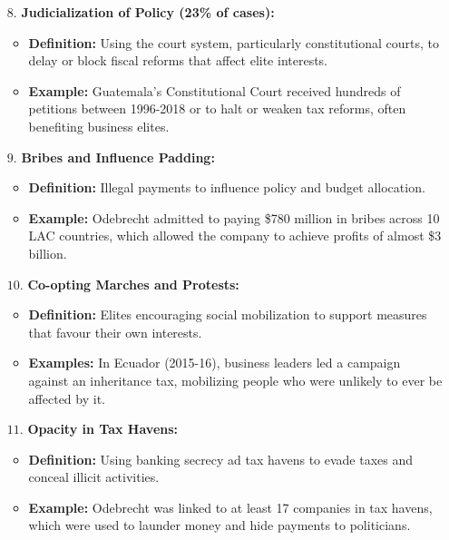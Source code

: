 \documentclass{article}
\begin{document}
\begin{itemize}
\begin{itemize}
        \end{itemize}
        \item[$8$.] \textbf{Judicialization of Policy (23\% of cases):}
        \begin{itemize}
            \item \textbf{Definition:} Using the court system, particularly
            constitutional courts, to delay or block fiscal reforms that
            affect elite interests.
            \item \textbf{Example:} Guatemala's Constitutional Court
            received hundreds of petitions between 1996-2018 or to halt or
            weaken tax reforms, often benefiting business elites.
        \end{itemize}
        \item[$9$.] \textbf{Bribes and Influence Padding:}
        \begin{itemize}
            \item \textbf{Definition:} Illegal payments to influence policy
            and budget allocation.
            \item \textbf{Example:} Odebrecht admitted to paying \$780
            million in bribes across 10 LAC countries, which allowed the
            company to achieve profits of almost \$3 billion.
        \end{itemize}
        \item[$10$.] \textbf{Co-opting Marches and Protests:}
        \begin{itemize}
            \item \textbf{Definition:} Elites encouraging social
            mobilization to support measures that favour their own interests.
            \item \textbf{Examples:} In Ecuador (2015-16), business leaders
            led a campaign against an inheritance tax, mobilizing people who
            were unlikely to ever be affected by it.
        \end{itemize}
        \item[$11$.] \textbf{Opacity in Tax Havens:}
        \begin{itemize}
            \item \textbf{Definition:} Using banking secrecy ad tax havens
            to evade taxes and conceal illicit activities.
            \item \textbf{Example:} Odebrecht was linked to at least 17
            companies in tax havens, which were used to launder money and
            hide payments to politicians.
        \end{itemize}
    \end{itemize}
\end{document}
